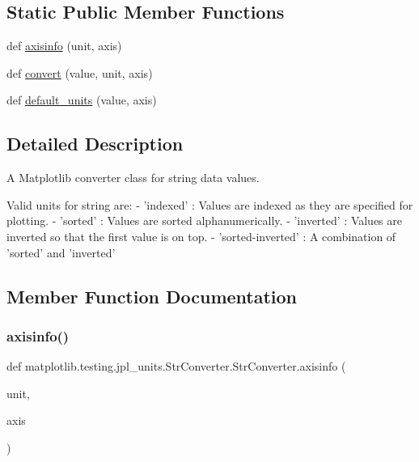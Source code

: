 \subsection*{Static Public Member Functions}
\begin{DoxyCompactItemize}
\item 
def \hyperlink{classmatplotlib_1_1testing_1_1jpl__units_1_1StrConverter_1_1StrConverter_a57b252fb1907659f15a711a5592c7798}{axisinfo} (unit, axis)
\item 
def \hyperlink{classmatplotlib_1_1testing_1_1jpl__units_1_1StrConverter_1_1StrConverter_a604b0f79d6c7b79c6b28d1212ad909e2}{convert} (value, unit, axis)
\item 
def \hyperlink{classmatplotlib_1_1testing_1_1jpl__units_1_1StrConverter_1_1StrConverter_a06fc6016509b4d7776524cd9a9f2a7f8}{default\+\_\+units} (value, axis)
\end{DoxyCompactItemize}


\subsection{Detailed Description}
\begin{DoxyVerb}A Matplotlib converter class for string data values.

Valid units for string are:
- 'indexed' : Values are indexed as they are specified for plotting.
- 'sorted'  : Values are sorted alphanumerically.
- 'inverted' : Values are inverted so that the first value is on top.
- 'sorted-inverted' :  A combination of 'sorted' and 'inverted'
\end{DoxyVerb}
 

\subsection{Member Function Documentation}
\mbox{\label{classmatplotlib_1_1testing_1_1jpl__units_1_1StrConverter_1_1StrConverter_a57b252fb1907659f15a711a5592c7798}} 
\subsubsection{\texorpdfstring{axisinfo()}{axisinfo()}}
{\footnotesize\ttfamily def matplotlib.\+testing.\+jpl\+\_\+units.\+Str\+Converter.\+Str\+Converter.\+axisinfo (\begin{DoxyParamCaption}\item[{}]{unit,  }\item[{}]{axis }\end{DoxyParamCaption})\hspace{0.3cm}{\ttfamily [static]}}

